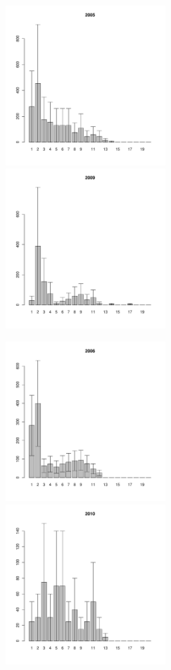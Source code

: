 \documentclass[12pt, a4paper]{article}
\begin{document}
\begin{figure}[h]
\begin{multicols}{3}
\hfill
\includegraphics[width=60mm]{../White_Sea/Luvenga_Goreliy/high_2005_.pdf}
\hfill
\includegraphics[width=60mm]{../White_Sea/Luvenga_Goreliy/high_2009_.pdf}
\end{multicols}


\begin{multicols}{3}
\hfill
\includegraphics[width=60mm]{../White_Sea/Luvenga_Goreliy/high_2006_.pdf}
\hfill
\includegraphics[width=60mm]{../White_Sea/Luvenga_Goreliy/high_2010_.pdf}
\end{multicols}


\end{figure}
\end{document}

